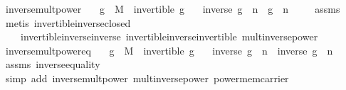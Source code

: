 \begin{isabellebody}
%
\isadelimproof
\isanewline
%
\endisadelimproof
\isanewline
{}\isamarkupfalse%
\ inverse{\isacharunderscore}{\kern0pt}mult{\isacharunderscore}{\kern0pt}power{\isacharcolon}{\kern0pt}\isanewline
\ \ \ {\isachardoublequoteopen}g\ {\isasymin}\ M{\isachardoublequoteclose}\ \ {\isachardoublequoteopen}invertible\ g{\isachardoublequoteclose}\isanewline
\ \ \ {\isachardoublequoteopen}{\isacharparenleft}{\kern0pt}{\isacharparenleft}{\kern0pt}inverse\ g{\isacharparenright}{\kern0pt}\ {\isacharcircum}{\kern0pt}\ n{\isacharparenright}{\kern0pt}\ {\isasymcdot}\ g\ {\isacharcircum}{\kern0pt}\ n\ {\isacharequal}{\kern0pt}\ {\isasymone}{\isachardoublequoteclose}%
\isadelimproof
\ %
\endisadelimproof
%
\isatagproof
{}\isamarkupfalse%
\ assms\ \isamarkupfalse%
\ {\isacharparenleft}{\kern0pt}metis\ invertible{\isacharunderscore}{\kern0pt}inverse{\isacharunderscore}{\kern0pt}closed\ \isanewline
\ \ \ \ invertible{\isacharunderscore}{\kern0pt}inverse{\isacharunderscore}{\kern0pt}inverse\ invertible{\isacharunderscore}{\kern0pt}inverse{\isacharunderscore}{\kern0pt}invertible\ mult{\isacharunderscore}{\kern0pt}inverse{\isacharunderscore}{\kern0pt}power{\isacharparenright}{\kern0pt}%
\endisatagproof
{\isafoldproof}%
%
\isadelimproof
%
\endisadelimproof
\isanewline
\isanewline
{}\isamarkupfalse%
\ inverse{\isacharunderscore}{\kern0pt}mult{\isacharunderscore}{\kern0pt}power{\isacharunderscore}{\kern0pt}eq{\isacharcolon}{\kern0pt}\isanewline
\ \ \ {\isachardoublequoteopen}g\ {\isasymin}\ M{\isachardoublequoteclose}\ \ {\isachardoublequoteopen}invertible\ g{\isachardoublequoteclose}\isanewline
\ \ \ {\isachardoublequoteopen}inverse\ {\isacharparenleft}{\kern0pt}g\ {\isacharcircum}{\kern0pt}\ n{\isacharparenright}{\kern0pt}\ {\isacharequal}{\kern0pt}\ {\isacharparenleft}{\kern0pt}inverse\ g{\isacharparenright}{\kern0pt}\ {\isacharcircum}{\kern0pt}\ n{\isachardoublequoteclose}\isanewline
%
\isadelimproof
\ \ %
\endisadelimproof
%
\isatagproof
{}\isamarkupfalse%
\ assms\ inverse{\isacharunderscore}{\kern0pt}equality\ \isamarkupfalse%
\ {\isacharparenleft}{\kern0pt}simp\ add{\isacharcolon}{\kern0pt}\ inverse{\isacharunderscore}{\kern0pt}mult{\isacharunderscore}{\kern0pt}power\ mult{\isacharunderscore}{\kern0pt}inverse{\isacharunderscore}{\kern0pt}power\ power{\isacharunderscore}{\kern0pt}mem{\isacharunderscore}{\kern0pt}carrier{\isacharparenright}{\kern0pt}%
\endisatagproof
{\isafoldproof}%

\end{isabellebody}
